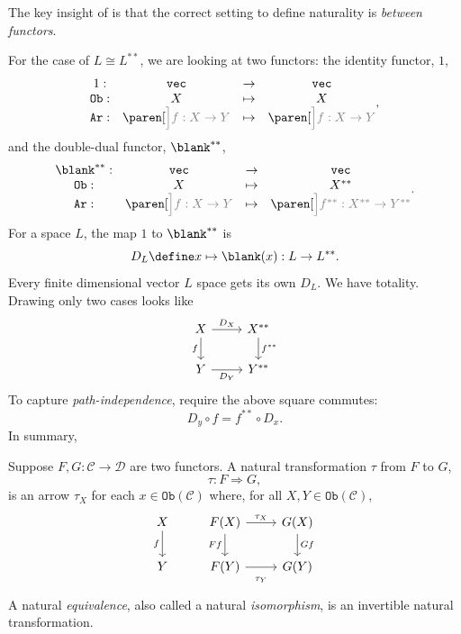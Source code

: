 \documentclass[a5paper]{scrartcl}
\def\cat{\mathcal{C}}
\def\veccat{\texttt{vec}}
\newcommand{\obj}{\texttt{Ob}}
\newcommand{\arr}{\texttt{Ar}}
\begin{document}
The key insight of \cite{natural-equivalence} is that the correct setting to define naturality is \emph{between functors}.

For the case of \(L \cong L^{**}\), we are looking at two functors: the identity functor, \(1\),
\[
  \begin{matrix}
    1 :& \veccat &\to& \veccat \\
    \obj:& X &\mapsto & X \\
    \arr:& \paren[\color{gray}\Big]{f: X \to Y} &\mapsto & \paren[\color{gray}\Big]{f : X \to Y}
  \end{matrix},
\]
and the double-dual functor, \(\blank^{**}\),
\[
  \begin{matrix}
    \blank^{**} :& \veccat &\to& \veccat \\
    \obj:& X &\mapsto & X^{**} \\
    \arr:& \paren[\color{gray}\Big]{f: X \to Y} &\mapsto & \paren[\color{gray}\Big]{f^{**} : X^{**} \to Y^{**}}
  \end{matrix}.
\]
For a space \(L\), the map \(1\) to \(\blank^{**}\) is
\[
  D_L\define x\mapsto \blank (x) : L \to L^{**}.
\]
Every finite dimensional vector \(L\) space gets its own \(D_L\). We have totality. Drawing only two cases looks like
\[
  \begin{tikzcd}
    X\rar{D_X}\dar[swap]{f}& X^{**}\dar{f^{**}}\\
    Y\rar[swap]{D_Y} & Y^{**}
  \end{tikzcd}
\]
To capture \emph{path-independence}, require the above square commutes:
\[
  D_y \circ f = f^{**} \circ D_x.
\]
In summary,
\begin{defn}
  Suppose \(F,G:\cat \to \mathcal{D}\) are two functors.
  A natural transformation \(\tau\) from \(F\) to \(G\),
  \[
    \tau: F \Rightarrow G,
  \]
  is an arrow \(\tau_X\) for each \(x\in\obj(\cat)\) where, for all \(X,Y \in \obj(\cat)\),
  \[
    \begin{tikzcd}
      X \dar[swap]{f}&  F(X)\rar{\tau_X}\dar[swap]{Ff}& G(X)\dar{Gf}\\
      Y        &  F(Y)\rar[swap]{\strut\tau_Y} & G(Y)
    \end{tikzcd}
  \]
  A natural \emph{equivalence}, also called a natural \emph{isomorphism}, is an invertible natural transformation.
\end{defn}
\end{document}
